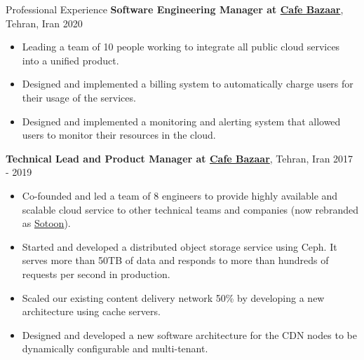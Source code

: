 \documentclass{resume} %
\begin{document}
\begin{rSection}{Professional Experience}
	{\bf Software Engineering Manager at \href{https://cafebazaar.ir/app?l=en}{Cafe Bazaar}}, Tehran, Iran \hfill 2020
	\smallskip
	\vspace{-0.5em}
	\begin{itemize}[leftmargin=3mm]
		\setlength{\itemsep}{1pt}
		\setlength{\parskip}{0pt}
		\setlength{\parsep}{0pt}
		\renewcommand\labelitemi{$\cdot$}

		\item Leading a team of 10 people working to integrate all public cloud services 
            into a unified product.
		\item Designed and implemented a billing system to automatically charge users for
            their usage of the services.
		\item Designed and implemented a monitoring and alerting system that allowed users
            to monitor their resources in the cloud.
	\end{itemize}
	
	{\bf Technical Lead and Product Manager at \href{https://cafebazaar.ir/app?l=en}{Cafe Bazaar}}, Tehran, Iran \hfill 2017 - 2019
	\smallskip
	\vspace{-0.5em}
	\begin{itemize}[leftmargin=3mm]
		\setlength{\itemsep}{1pt}
		\setlength{\parskip}{0pt}
		\setlength{\parsep}{0pt}
		\renewcommand\labelitemi{$\cdot$}

		\item Co-founded and led a team of 8 engineers to provide highly available and 
            scalable cloud service to other technical teams and companies (now rebranded 
            as \href{https://sotoon.ir/}{Sotoon}).
		\item Started and developed a distributed object storage service using Ceph. 
            It serves more than 50TB of data and responds to more than hundreds of 
            requests per second in production.
		\item Scaled our existing content delivery network 50\% by developing a new 
            architecture using cache servers.
		\item Designed and developed a new software architecture for the CDN nodes to be 
            dynamically configurable and multi-tenant.%
	\end{itemize}
	

\end{rSection}
\end{document}
